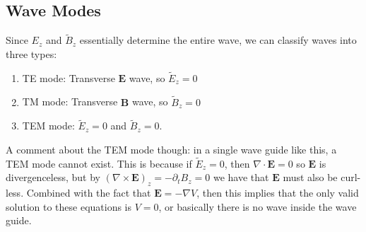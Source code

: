 \subsection{Wave Modes}
Since \( E_z \) and \( \tilde B_z \) essentially determine the entire wave, we can classify waves into three
types:
\begin{enumerate}[label=\arabic*.]
	\item TE mode: Transverse \( \mathbf{E} \) wave, so \( \tilde E_z = 0 \)
	\item TM mode: Transverse \( \mathbf{B} \) wave, so \( \tilde B_z = 0 \)
	\item TEM mode: \( \tilde E_z = 0 \) and \( \tilde B_z = 0 \). 
\end{enumerate}
A comment about the TEM mode though: in a single wave guide like this, a TEM mode cannot exist. This is
because if \( \tilde E_z = 0 \), then \( \nabla \cdot \mathbf{E} = 0 \) so \( \mathbf{E} \) is
divergenceless, but by \( (\nabla \times \mathbf{E})_z = -\partial_t B_z = 0 \) we have that 
\( \mathbf{E} \) must also be curl-less. Combined with the fact that \( \mathbf{E} = - \nabla V \), then this
implies that the only valid solution to these equations is \( V = 0 \), or basically there is no wave inside
the wave guide.   



